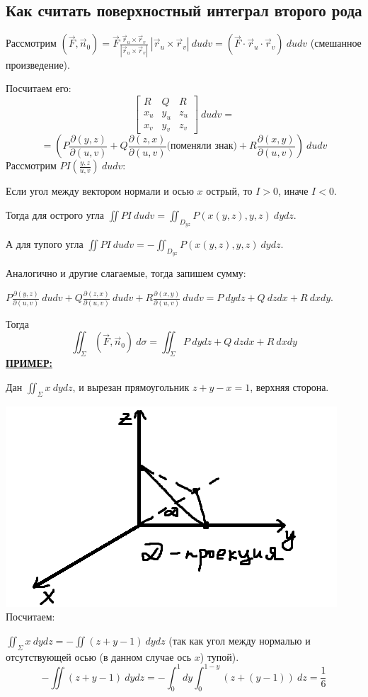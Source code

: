 \documentclass[12pt]{article}
\begin{document}
\subsection{Как считать поверхностный интеграл второго рода}
Рассмотрим $(\overrightarrow{F}, \overrightarrow{n}_0) = \overrightarrow{F} \frac{\overrightarrow{r}_u \times \overrightarrow{r}_v}{|\overrightarrow{r}_u \times \overrightarrow{r}_v|} \ |\overrightarrow{r}_u \times \overrightarrow{r}_v| \ dudv = (\overrightarrow{F} \cdot \overrightarrow{r}_u \cdot \overrightarrow{r}_v) \ dudv$ (смешанное произведение).\par
Посчитаем его:
$$\begin{bmatrix} R & Q & R \\ x_u & y_u & z_u \\ x_v & y_v & z_v \end{bmatrix} \ dudv =$$
$$= (P \frac{\partial (y,z)}{\partial(u,v)} + Q \frac{\partial (z,x)}{\partial(u,v)}\text{(поменяли знак)} + R\frac{\partial (x,y)}{\partial(u,v)}) \ dudv$$
Рассмотрим $PI (\frac{y,z}{u,v}) \ du dv$:\par
Если угол между вектором нормали и осью $x$ острый, то $I > 0$, иначе $I < 0$.\par
Тогда для острого угла $\iint PI \ du dv = \iint_{D_{yz}} P (x(y,z),y,z) \ dydz$.\par
А для тупого угла $\iint PI \ du dv = - \iint_{D_{yz}} P (x(y,z),y,z) \ dydz$.\par
Аналогично и другие слагаемые, тогда запишем сумму:\par
$P \frac{\partial (y,z)}{\partial(u,v)}\ dudv + Q \frac{\partial (z,x)}{\partial(u,v)}\ dudv + R\frac{\partial (x,y)}{\partial(u,v)} \ dudv = P\ dydz + Q\ dzdx + R \ dxdy$.\par
Тогда
$$\iint_\Sigma (\overrightarrow{F}, \overrightarrow{n}_0) \ d\sigma = \iint_\Sigma P \ dydz + Q \ dzdx + R \ dxdy$$
\uline{\textbf{ПРИМЕР:}}\par
Дан $\iint_\Sigma x \ dydz$, и вырезан прямоугольник $z + y - x = 1$, верхняя сторона.\par
\includegraphics{triangleCut1}
Посчитаем:\par
$\iint_\Sigma x \ dydz = - \iint (z+y-1)\ dydz$ (так как угол между нормалью и отсутствующей осью (в данном случае ось $x$) тупой).
$$- \iint (z+y-1)\ dydz = - \int_0^1 dy \int_0^{1-y}(z+(y-1))\ dz = \frac{1}{6}$$
\end{document}
